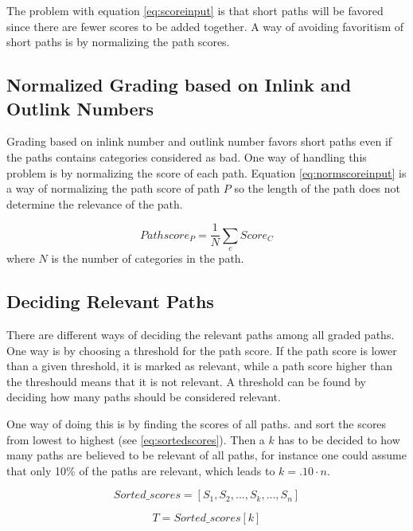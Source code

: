 The problem with equation \ref{eq:scoreinput} is that short paths will be favored since there are fewer scores to be added together. A way of avoiding favoritism of short paths is by normalizing the path scores. 

\subsection{Normalized Grading based on Inlink and Outlink Numbers}
Grading based on inlink number and outlink number favors short paths even if the paths contains categories considered as bad. One way of handling this problem is by normalizing the score of each path. Equation \ref{eq:normscoreinput} is a way of normalizing the path score of path $P$ so the length of the path does not determine the relevance of the path. 


\begin{equation} \label{eq:normscoreinput}
Pathscore_{P} = \frac{1}{N} \sum_{c} Score_{C}
\end{equation}
where $N$ is the number of categories in the path.


\subsection{Deciding Relevant Paths}
There are different ways of deciding the relevant paths among all graded paths. One way is by choosing a threshold for the path score. If the path score is lower than a given threshold, it is marked as relevant, while a path score higher than the threshould means that it is not relevant. A threshold can be found by deciding how many paths should be considered relevant.

One way of doing this is by finding the scores of all paths. and sort the scores from lowest to highest (see \ref{eq:sortedscores}). Then a $k$ has to be decided to how many paths are believed to be relevant of all paths, for instance one could assume that only 10\% of the paths are relevant, which leads to $k = .10 \cdot n$. 

\begin{equation} \label{eq:sortedscores}
Sorted\_scores = \left[ S_{1}, S_{2}, ... , S_{k}, ... , S_{n} \right]
\end{equation}



\begin{equation} \label{eq:threshold}
T = Sorted\_scores[k]
\end{equation}


